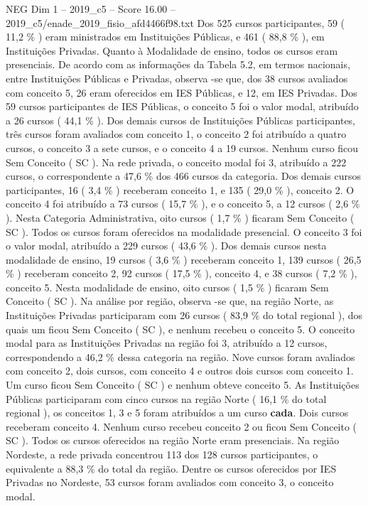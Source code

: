\begin{textsample}{NEG Dim 1 – 2019\_c5 – Score 16.00 – 2019\_c5/enade\_2019\_fisio\_afd4466f98.txt}
Dos 525 cursos participantes, 59 ( 11,2 \% ) eram ministrados em Instituições Públicas, e 461 ( 88,8 \% ), em Instituições Privadas.
Quanto à Modalidade de ensino, todos os cursos eram presenciais.
De acordo com as informações da Tabela 5.2, em termos nacionais, entre Instituições Públicas e Privadas, observa -se que, dos 38 cursos avaliados com conceito 5, 26 eram oferecidos em IES Públicas, e 12, em IES Privadas.
Dos 59 cursos participantes de IES Públicas, o conceito 5 foi o valor modal, atribuído a 26 cursos ( 44,1 \% ).
Dos demais cursos de Instituições Públicas participantes, três cursos foram avaliados com conceito 1, o conceito 2 foi atribuído a quatro cursos, o conceito 3 a sete cursos, e o conceito 4 a 19 cursos.
Nenhum curso ficou Sem Conceito ( SC ).
Na rede privada, o conceito modal foi 3, atribuído a 222 cursos, o correspondente a 47,6 \% dos 466 cursos da categoria.
Dos demais cursos participantes, 16 ( 3,4 \% ) receberam conceito 1, e 135 ( 29,0 \% ), conceito 2.
O conceito 4 foi atribuído a 73 cursos ( 15,7 \% ), e o conceito 5, a 12 cursos ( 2,6 \% ).
Nesta Categoria Administrativa, oito cursos ( 1,7 \% ) ficaram Sem Conceito ( SC ).
Todos os cursos foram oferecidos na modalidade presencial.
O conceito 3 foi o valor modal, atribuído a 229 cursos ( 43,6 \% ).
Dos demais cursos nesta modalidade de ensino, 19 cursos ( 3,6 \% ) receberam conceito 1, 139 cursos ( 26,5 \% ) receberam conceito 2, 92 cursos ( 17,5 \% ), conceito 4, e 38 cursos ( 7,2 \% ), conceito 5.
Nesta modalidade de ensino, oito cursos ( 1,5 \% ) ficaram Sem Conceito ( SC ).
Na análise por região, observa -se que, na região Norte, as Instituições Privadas participaram com 26 cursos ( 83,9 \% do total regional ), dos quais um ficou Sem Conceito ( SC ), e nenhum recebeu o conceito 5.
O conceito modal para as Instituições Privadas na região foi 3, atribuído a 12 cursos, correspondendo a 46,2 \% dessa categoria na região.
Nove cursos foram avaliados com conceito 2, dois cursos, com conceito 4 e outros dois cursos com conceito 1.
Um curso ficou Sem Conceito ( SC ) e nenhum obteve conceito 5.
As Instituições Públicas participaram com cinco cursos na região Norte ( 16,1 \% do total regional ), os conceitos 1, 3 e 5 foram atribuídos a um curso \textbf{cada}.
Dois cursos receberam conceito 4.
Nenhum curso recebeu conceito 2 ou ficou Sem Conceito ( SC ).
Todos os cursos oferecidos na região Norte eram presenciais.
Na região Nordeste, a rede privada concentrou 113 dos 128 cursos participantes, o equivalente a 88,3 \% do total da região.
Dentre os cursos oferecidos por IES Privadas no Nordeste, 53 cursos foram avaliados com conceito 3, o conceito modal.

\end{textsample}

